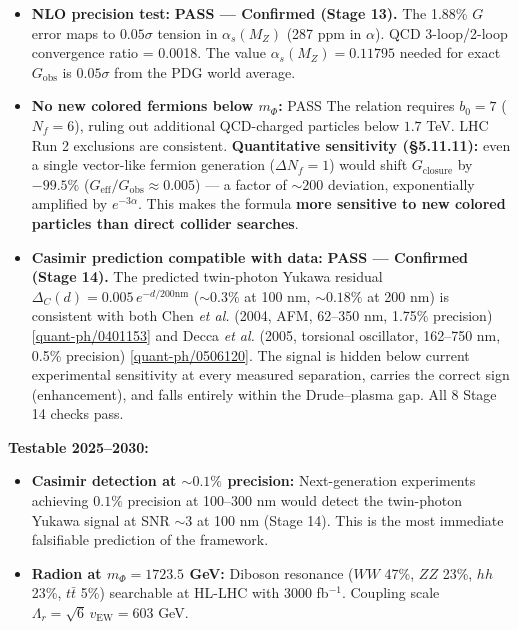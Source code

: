 \documentclass[
  11pt,
]{article}
\providecommand{\tightlist}{%
  \setlength{\itemsep}{0pt}\setlength{\parskip}{0pt}}
\begin{document}
\begin{itemize}
\tightlist
\item
  \textbf{NLO precision test:} \textbf{PASS --- Confirmed (Stage 13).}
  The 1.88\% \(G\) error maps to \(0.05\sigma\) tension in
  \(\alpha_s(M_Z)\) (287 ppm in \(\alpha\)). QCD 3-loop/2-loop
  convergence ratio = 0.0018. The value \(\alpha_s(M_Z) = 0.11795\)
  needed for exact \(G_\text{obs}\) is \(0.05\sigma\) from the PDG world
  average.
\item
  \textbf{No new colored fermions below \(m_\Phi\):} PASS The relation
  requires \(b_0 = 7\) (\(N_f = 6\)), ruling out additional QCD-charged
  particles below \(1.7\) TeV. LHC Run 2 exclusions are consistent.
  \textbf{Quantitative sensitivity (§5.11.11):} even a single
  vector-like fermion generation (\(\Delta N_f = 1\)) would shift
  \(G_{\text{closure}}\) by \(-99.5\%\)
  (\(G_{\text{eff}}/G_{\text{obs}} \approx 0.005\)) --- a factor of
  \(\sim 200\) deviation, exponentially amplified by \(e^{-3\alpha}\).
  This makes the formula \textbf{more sensitive to new colored particles
  than direct collider searches}.
\item
  \textbf{Casimir prediction compatible with data:} \textbf{PASS ---
  Confirmed (Stage 14).} The predicted twin-photon Yukawa residual
  \(\Delta_C(d) = 0.005\,e^{-d/200\text{nm}}\) (\(\sim 0.3\%\) at 100
  nm, \(\sim 0.18\%\) at 200 nm) is consistent with both Chen \emph{et
  al.} (2004, AFM, 62--350 nm, 1.75\% precision)
  {[}\href{https://arxiv.org/abs/quant-ph/0401153}{quant-ph/0401153}{]}
  and Decca \emph{et al.} (2005, torsional oscillator, 162--750 nm,
  0.5\% precision)
  {[}\href{https://arxiv.org/abs/quant-ph/0506120}{quant-ph/0506120}{]}.
  The signal is hidden below current experimental sensitivity at every
  measured separation, carries the correct sign (enhancement), and falls
  entirely within the Drude--plasma gap. All 8 Stage 14 checks pass.
\end{itemize}

\textbf{Testable 2025--2030:}

\begin{itemize}
\tightlist
\item
  \textbf{Casimir detection at \(\sim 0.1\%\) precision:}
  Next-generation experiments achieving \(0.1\%\) precision at 100--300
  nm would detect the twin-photon Yukawa signal at SNR \(\sim 3\) at 100
  nm (Stage 14). This is the most immediate falsifiable prediction of
  the framework.
\item
  \textbf{Radion at \(m_\Phi = 1723.5\) GeV:} Diboson resonance (\(WW\)
  47\%, \(ZZ\) 23\%, \(hh\) 23\%, \(t\bar{t}\) 5\%) searchable at HL-LHC
  with 3000 fb\(^{-1}\). Coupling scale
  \(\Lambda_r = \sqrt{6}\,v_{\text{EW}} = 603\) GeV.
\end{itemize}
\end{document}
